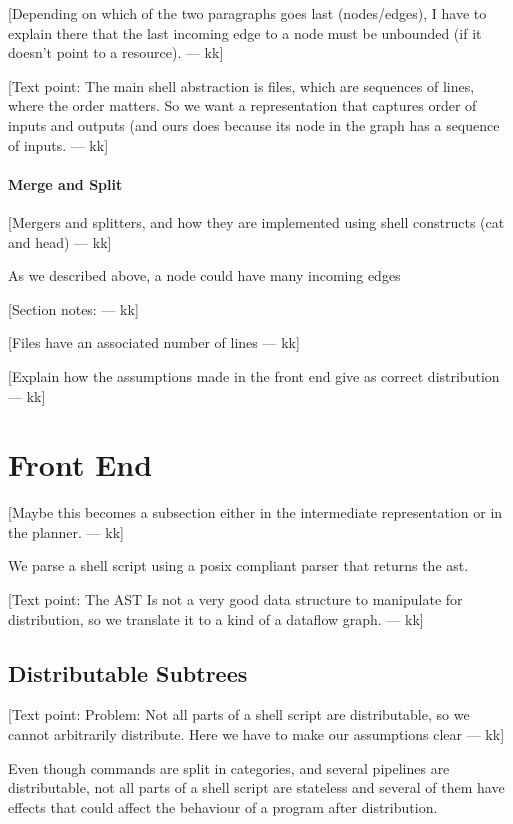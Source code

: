 \documentclass[sigplan,10pt,review,anonymous]{acmart}
\newcommand{\kk}[1]{[{\color{magenta}#1 --- kk}]}
\begin{document}
\kk{Depending on which of the two paragraphs goes last (nodes/edges),
  I have to explain there that the last incoming edge to a node must
  be unbounded (if it doesn't point to a resource).}


\kk{Text point: The main shell abstraction is files, which are
  sequences of lines, where the order matters. So we want a
  representation that captures order of inputs and outputs (and ours
  does because its node in the graph has a sequence of inputs.}


\paragraph{Merge and Split}

\kk{Mergers and splitters, and how they are implemented using shell constructs (cat and head)}


As we described above, a node could have many incoming edges 

\kk{Section notes:}

\kk{Files have an associated number of lines}

\kk{Explain how the assumptions made in the front end give as correct
  distribution}



\section{Front End}

\kk{Maybe this becomes a subsection either in the intermediate
  representation or in the planner.}

We parse a shell script using a posix compliant parser that returns
the ast.

\kk{Text point: The AST Is not a very good data structure to
  manipulate for distribution, so we translate it to a kind of a
  dataflow graph.}

\subsection{Distributable Subtrees}

\kk{Text point: Problem: Not all parts of a shell script are
  distributable, so we cannot arbitrarily distribute. Here we have to
  make our assumptions clear}

Even though commands are split in categories, and several pipelines
are distributable, not all parts of a shell script are stateless and
several of them have effects that could affect the behaviour of a
program after distribution.
\end{document}
